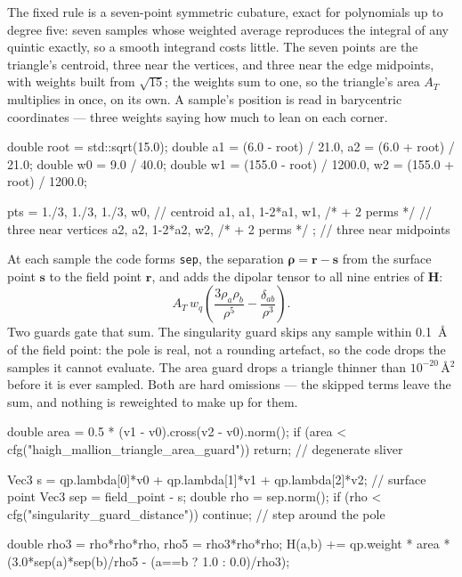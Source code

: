 \documentclass[11pt]{article}
\newcommand{\code}[1]{\texttt{#1}}
\begin{document}
The fixed rule is a seven-point symmetric cubature, exact for polynomials up to degree
five: seven samples whose weighted average reproduces the integral of any quintic
exactly, so a smooth integrand costs little. The seven points are the triangle's
centroid, three near the vertices, and three near the edge midpoints, with weights built
from \(\sqrt{15}\); the weights sum to one, so the triangle's area \(A_T\) multiplies in
once, on its own. A sample's position is read in barycentric coordinates --- three weights
saying how much to lean on each corner.

\begin{codebox}
double root = std::sqrt(15.0);
double a1 = (6.0 - root) / 21.0,     a2 = (6.0 + root) / 21.0;
double w0 = 9.0 / 40.0;
double w1 = (155.0 - root) / 1200.0, w2 = (155.0 + root) / 1200.0;

pts = {{ {{1./3, 1./3, 1./3}, w0},                  // centroid
         {{a1, a1, 1-2*a1}, w1}, /* + 2 perms */     // three near vertices
         {{a2, a2, 1-2*a2}, w2}, /* + 2 perms */ }}; // three near midpoints
\end{codebox}

At each sample the code forms \code{sep}, the separation \(\bm\rho = \bm r - \bm s\) from
the surface point \(\bm s\) to the field point \(\bm r\), and adds the dipolar tensor to
all nine entries of \(\bm H\):
\[
  A_T\,w_q\left(\frac{3\rho_a\rho_b}{\rho^5} - \frac{\delta_{ab}}{\rho^3}\right).
\]
Two guards gate that sum. The singularity guard skips any sample within
\SI{0.1}{\angstrom} of the field point: the pole is real, not a rounding artefact, so the
code drops the samples it cannot evaluate. The area guard drops a triangle thinner than
\(10^{-20}\,\si{\angstrom^2}\) before it is ever sampled. Both are hard omissions --- the
skipped terms leave the sum, and nothing is reweighted to make up for them.

\begin{codebox}
double area = 0.5 * (v1 - v0).cross(v2 - v0).norm();
if (area < cfg("haigh_mallion_triangle_area_guard")) return;   // degenerate sliver

Vec3 s   = qp.lambda[0]*v0 + qp.lambda[1]*v1 + qp.lambda[2]*v2; // surface point
Vec3 sep = field_point - s;
double rho = sep.norm();
if (rho < cfg("singularity_guard_distance")) continue;         // step around the pole

double rho3 = rho*rho*rho, rho5 = rho3*rho*rho;
H(a,b) += qp.weight * area *
          (3.0*sep(a)*sep(b)/rho5 - (a==b ? 1.0 : 0.0)/rho3);
\end{codebox}
\end{document}

